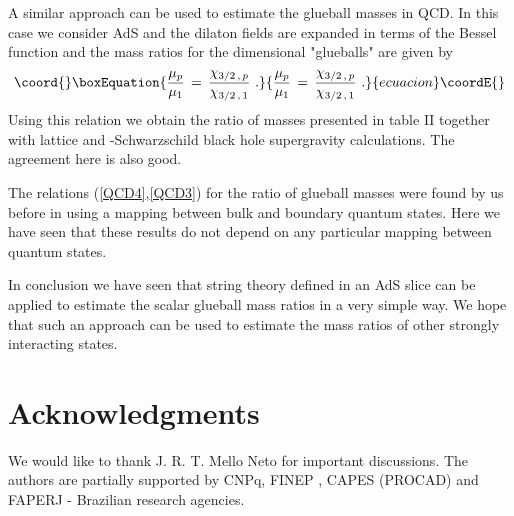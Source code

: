 \documentclass[a4paper,twocolumn,prl,groupedaddress,nofootinbib,showpacs]{revtex4}
\begin{document}
A similar approach can be used to  estimate the glueball masses in 
QCD\coordHE{}. In this case we consider  AdS\coordHE{} and the dilaton fields 
are expanded in terms of the Bessel function \coordHE{} and the 
mass ratios for the \coordHE{} dimensional "glueballs"  are given by 
\begin{equation}\coord{}\boxEquation{
\label{QCD3}
{ \mu_p\over \mu_1 }\,=\,{\chi_{3/2\,,\,p}\over \chi_{3/2\,,\,1}}\,\,.
}{
{ \mu_p\over \mu_1 }\,=\,{\chi_{3/2\,,\,p}\over \chi_{3/2\,,\,1}}\,\,.
}{ecuacion}\coordE{}\end{equation}
\noindent 
Using this relation we obtain the ratio of masses presented in table
II together with lattice and \coordHE{}-Schwarzschild black hole supergravity 
calculations. The agreement here is also good.

The relations (\ref{QCD4},\ref{QCD3}) for the ratio of glueball masses 
were found by us before in \cite{BB4} using a mapping between
bulk and boundary quantum states.   
Here we have seen that these results do not depend on any particular  
mapping between quantum states.

In conclusion we have seen that string theory defined in an AdS slice 
can be applied to estimate the scalar glueball mass ratios in a very
simple way. We hope that such an approach can be used to  
estimate the mass ratios of other strongly interacting states.
  
 
\section*{Acknowledgments}
We would like to thank J. R. T. Mello Neto for important discussions.
The authors are partially supported by CNPq, FINEP , CAPES (PROCAD) 
and FAPERJ - Brazilian research agencies. 



  
\end{document}
